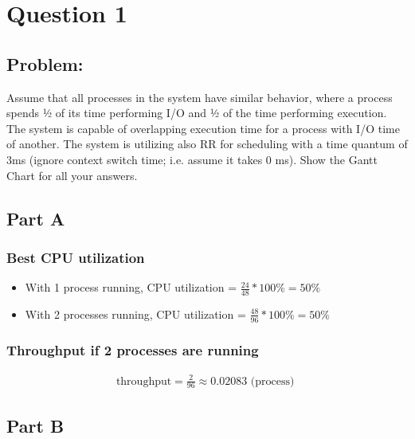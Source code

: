 \newpage
\section{Question 1}
\subsection{Problem:}
Assume that all processes in the system have similar behavior, where a process spends ½ of its time
performing I/O and ½ of the time performing execution. The system is capable of overlapping execution
time for a process with I/O time of another. The system is utilizing also RR for scheduling with a time
quantum of 3ms (ignore context switch time; i.e. assume it takes 0 ms). Show the Gantt Chart for all your
answers.

\subsection{Part A }
\subsubsection{Best CPU utilization}



\begin{itemize}
    \item With 1 process running, CPU utilization = $\frac{24}{48} * 100\% = 50\%$
    \item With 2 processes running, CPU utilization = $\frac{48}{96} * 100\% = 50\%$
\end{itemize}

\subsubsection{Throughput if 2 processes are running}
\begin{align*}
    \text{throughput} = \frac{2}{96} \approx 0.02083 \text{ (process) }
\end{align*}


\subsection{Part B }
